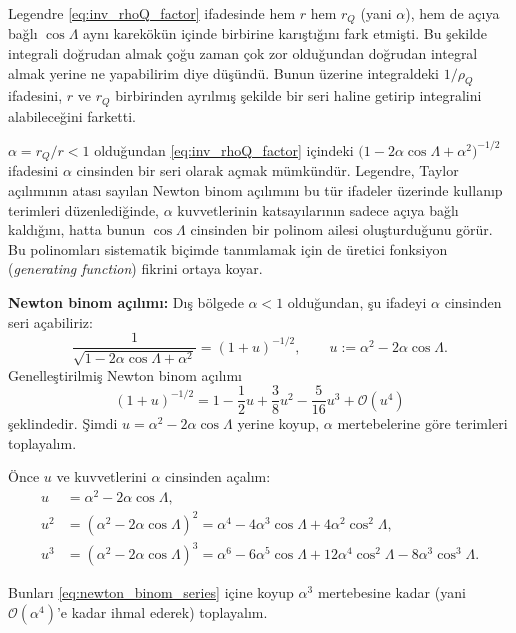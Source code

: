 Legendre \eqref{eq:inv_rhoQ_factor} ifadesinde hem $r$ hem $r_Q$ (yani $\alpha$), hem de açıya bağlı $\cos\Lambda$ aynı karekökün içinde birbirine karıştığını fark etmişti. Bu şekilde integrali doğrudan almak çoğu zaman çok zor olduğundan doğrudan integral almak yerine ne yapabilirim diye düşündü. Bunun üzerine integraldeki $1/\rho_Q$ ifadesini, $r$ ve $r_Q$ birbirinden ayrılmış şekilde bir seri haline getirip integralini alabileceğini farketti.

\medskip
 $\alpha=r_Q/r<1$ olduğundan \eqref{eq:inv_rhoQ_factor} içindeki
\(\bigl(1-2\alpha\cos\Lambda+\alpha^2\bigr)^{-1/2}\) ifadesini
$\alpha$ cinsinden bir seri olarak açmak mümkündür.
Legendre, Taylor açılımının atası sayılan Newton binom açılımını
bu tür ifadeler üzerinde kullanıp terimleri düzenlediğinde,
$\alpha$ kuvvetlerinin katsayılarının sadece açıya bağlı kaldığını, hatta bunun $\cos\Lambda$ cinsinden bir polinom ailesi oluşturduğunu görür. Bu polinomları sistematik biçimde tanımlamak için de \textbf{}{üretici fonksiyon} (\emph{generating function}) fikrini ortaya koyar.

\medskip
\noindent
\textbf{Newton binom açılımı:}
Dış bölgede $\alpha<1$ olduğundan, şu ifadeyi $\alpha$ cinsinden seri açabiliriz:
\begin{equation}
\frac{1}{\sqrt{1-2\alpha\cos\Lambda+\alpha^2}}
=
\left(1+u\right)^{-1/2},
\qquad
u:=\alpha^2-2\alpha\cos\Lambda.
\label{eq:u_def}
\end{equation}
Genelleştirilmiş Newton binom açılımı
\begin{equation}
(1+u)^{-1/2}
=
1-\frac{1}{2}u+\frac{3}{8}u^2-\frac{5}{16}u^3+\mathcal{O}(u^4)
\label{eq:newton_binom_series}
\end{equation}
şeklindedir.
Şimdi $u=\alpha^2-2\alpha\cos\Lambda$ yerine koyup,
$\alpha$ mertebelerine göre terimleri toplayalım.

Önce $u$ ve kuvvetlerini $\alpha$ cinsinden açalım:
\begin{align}
u &= \alpha^2-2\alpha\cos\Lambda,\\[4pt]
u^2 &= (\alpha^2-2\alpha\cos\Lambda)^2
= \alpha^4 -4\alpha^3\cos\Lambda +4\alpha^2\cos^2\Lambda,\\[4pt]
u^3 &= (\alpha^2-2\alpha\cos\Lambda)^3
= \alpha^6 -6\alpha^5\cos\Lambda +12\alpha^4\cos^2\Lambda -8\alpha^3\cos^3\Lambda.
\end{align}

Bunları \eqref{eq:newton_binom_series} içine koyup
$\alpha^3$ mertebesine kadar (yani $\mathcal{O}(\alpha^4)$’e kadar ihmal ederek)
toplayalım.

